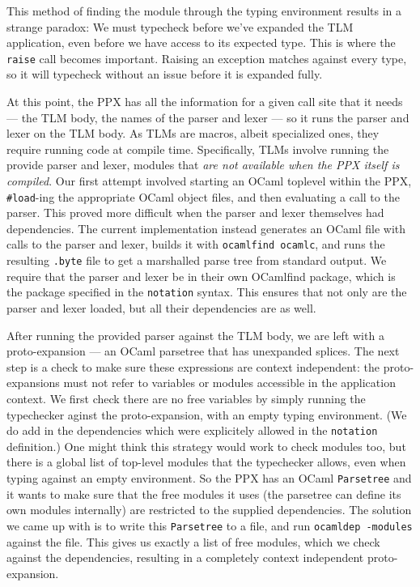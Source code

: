 \documentclass[acmsmall,review]{acmart}
\newcommand{\li}[1]{\lstinline[basicstyle=\ttfamily\fontsize{9pt}{1em}\selectfont]{#1}}
\theoremstyle{slplain}
\numberwithin{thm}{section}
\begin{document}
This method of finding the module through the typing environment results in a strange paradox: We must typecheck before we've expanded the TLM application, even before we have access to its expected type. This is where the \li{raise} call becomes important. Raising an exception matches against every type, so it will typecheck without an issue before it is expanded fully.

At this point, the PPX has all the information for a given call site that it needs --- the TLM body, the names of the parser and lexer --- so it runs the parser and lexer on the TLM body. As TLMs are macros, albeit specialized ones, they require running code at compile time. Specifically, TLMs involve running the provide parser and lexer, modules that {\it are not available when the PPX itself is compiled}. Our first attempt involved starting an OCaml toplevel within the PPX, \li{#load}-ing the appropriate OCaml object files, and then evaluating a call to the parser. This proved more difficult when the parser and lexer themselves had dependencies. The current implementation instead generates an OCaml file with calls to the parser and lexer, builds it with \li{ocamlfind ocamlc}, and runs the resulting \li{.byte} file to get a marshalled parse tree from standard output. We require that the parser and lexer be in their own OCamlfind package, which is the package specified in the \li{notation} syntax. This ensures that not only are the parser and lexer loaded, but all their dependencies are as well.

After running the provided parser against the TLM body, we are left with a proto-expansion --- an OCaml parsetree that has unexpanded splices. The next step is a check to make sure these expressions are context independent: the proto-expansions must not refer to variables or modules accessible in the application context. We first check there are no free variables by simply running the typechecker aginst the proto-expansion, with an empty typing environment. (We do add in the dependencies which were explicitely allowed in the \li{notation} definition.) One might think this strategy would work to check modules too, but there is a global list of top-level modules that the typechecker allows, even when typing against an empty environment. So the PPX has an OCaml \li{Parsetree} and it wants to make sure that the free modules it uses (the parsetree can define its own modules internally) are restricted to the supplied dependencies. The solution we came up with is to write this \li{Parsetree} to a file, and run \li{ocamldep -modules} against the file. This gives us exactly a list of free modules, which we check against the dependencies, resulting in a completely context independent proto-expansion.
\end{document}
